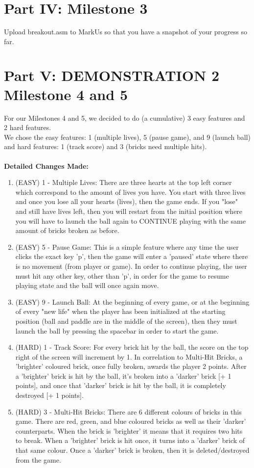\documentclass{article}
\begin{document}
\section{Part IV: Milestone 3}
\item Upload breakout.asm to MarkUs so that you have a snapshot of your progress so far.

\newpage
\section{Part V: DEMONSTRATION 2 Milestone 4 and 5}
\item For our Milestones 4 and 5, we decided to do (a cumulative) 3 easy features and 2 hard features. \\
We chose the easy features: 1 (multiple lives), 5 (pause game), and 9 (launch ball)
and hard features: 1 (track score) and 3 (bricks need multiple hits).
\\ \\
\textbf{Detailed Changes Made: }
\begin{enumerate}
  \item (EASY) 1 - Multiple Lives: There are three hearts at the top left corner which correspond to the amount of lives you have. You start with three lives and once you lose all your hearts (lives), then the game ends. If you "lose" and still have lives left, then you will restart from the initial position where you will have to launch the ball again to CONTINUE playing with the same amount of bricks broken as before.
  \item (EASY) 5 - Pause Game: This is a simple feature where any time the user clicks the exact key 'p', then the game will enter a 'paused' state where there is no movement (from player or game). In order to continue playing, the user must hit any other key, other than 'p', in order for the game to resume playing state and the ball will once again move.
  \item (EASY) 9 - Launch Ball: At the beginning of every game, or at the beginning of every "new life" when the player has been initialized at the starting position (ball and paddle are in the middle of the screen), then they must launch the ball by pressing the spacebar in order to start the game.
  \item (HARD) 1 - Track Score: For every brick hit by the ball, the score on the top right of the screen will increment by 1. In correlation to Multi-Hit Bricks, a 'brighter' coloured brick, once fully broken, awards the player 2 points. After a 'brighter' brick is hit by the ball, it's broken into a 'darker' brick [+ 1 points], and once that 'darker' brick is hit by the ball, it is completely destroyed [+ 1 points].
  \item (HARD) 3 - Multi-Hit Bricks: There are 6 different colours of bricks in this game. There are red, green, and blue coloured bricks as well as their 'darker' counterparts. When the brick is 'brighter' it means that it requires two hits to break. When a 'brighter' brick is hit once, it turns into a 'darker' brick of that same colour. Once a 'darker' brick is broken, then it is deleted/destroyed from the game. 
\end{enumerate}
\end{document}

